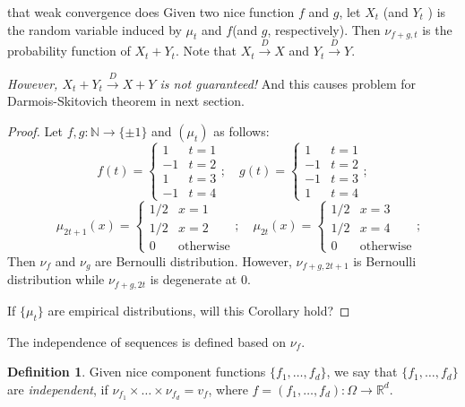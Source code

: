 \documentclass[english]{article} %
\newcommand{\real}{\mathbb{R}}
\renewcommand{\natural}{\mathbb{N}}
\theoremstyle{definition}
\newtheorem{definition}[lemma]{Definition}
\begin{document}
that weak convergence does 
Given two nice function $f$ and $g$, let $X_t$ (and $Y_t$ ) is the random variable induced by $\mu_t$ and $f$(and $g$, respectively). Then $\nu_{f+g,t}$ is the probability function of $X_t+Y_t$. Note that $X_t \xrightarrow{D} X$ and  $Y_t \xrightarrow{D} Y$. 

\emph{However, $X_t+Y_t \xrightarrow{D} X+Y$ is not guaranteed!} And this causes problem for Darmois-Skitovich theorem in next section.


\begin{proof}


Let $f,g:\natural \rightarrow \{\pm1\}$ and $(\mu_t)$ as follows: 
\[
f(t) = \begin{cases} 1 & t=1 \\
					-1 & t=2 \\
					1  & t=3 \\
					-1 & t=4 
					\end{cases};
\quad g(t) = \begin{cases} 1 & t=1 \\
					-1 & t=2 \\
					-1  & t=3 \\
					1 & t=4 
					\end{cases};
\]
\[
\quad \mu_{2t+1}(x) = \begin{cases} 1/2 & x=1 \\
					1/2 & x=2 \\
					0  & \text{otherwise} 
					\end{cases};	
\quad \mu_{2t}(x) = \begin{cases} 1/2 & x=3 \\
					1/2 & x=4 \\
					0  & \text{otherwise} 
					\end{cases};		
\]
Then $\nu_f$ and $\nu_g$ are Bernoulli distribution. However, $\nu_{f+g,2t+1}$ is Bernoulli distribution while $\nu_{f+g,2t}$ is degenerate at 0. 

If $\{\mu_t\}$ are empirical distributions, will this Corollary hold?
\end{proof}
The independence of sequences is defined based on $\nu_f$.
\begin{definition}
Given nice component functions $\{f_1,\ldots,f_d\}$, we say that $\{f_1,\ldots,f_d\}$ are \emph{independent}, if $\nu_{f_1}\times\ldots\times\nu_{f_d} = v_f$, where $f = (f_1,\ldots,f_d):\Omega \rightarrow \real^d$.
\end{definition}
\end{document}
